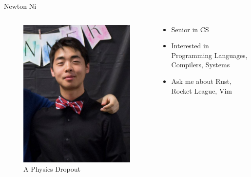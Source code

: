 \documentclass{beamer}
\begin{document}
    \begin{frame}{Newton Ni}
        \begin{columns}
            \begin{column}{0.48\textwidth}
                \begin{figure}
                    \centering
                    \includegraphics[scale = 0.20]{cn279.jpg}
                    \caption{A Physics Dropout}
                \end{figure}
            \end{column}
            \begin{column}{0.48\textwidth}
                \begin{itemize}
                    \item Senior in CS
                    \item Interested in Programming Languages, Compilers, Systems
                    \item Ask me about Rust, Rocket League, Vim
                \end{itemize}
            \end{column}
        \end{columns}
    \end{frame}
    
\end{document}
